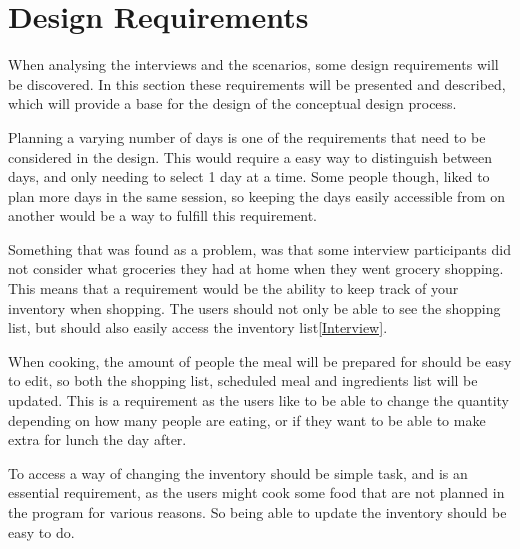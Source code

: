 \section{Design Requirements}

When analysing the interviews and the scenarios, some design requirements will be discovered. In this section these requirements will be presented and described, which will provide a base for the design of the conceptual design process.

Planning a varying number of days is one of the requirements that need to be considered in the design. This would require a easy way to distinguish between days, and only needing to select 1 day at a time.
Some people though, liked to plan more days in the same session, so keeping the days easily accessible from on another would be a way to fulfill this requirement.

Something that was found as a problem, was that some interview participants did not consider what groceries they had at home when they went grocery shopping. This means that a requirement would be the ability to keep track of your inventory when shopping. The users should not only be able to see the shopping list, but should also easily access the inventory list\ref{Interview}.

When cooking, the amount of people the meal will be prepared for should be easy to edit, so both the shopping list, scheduled meal and ingredients list will be updated. This is a requirement as the users like to be able to change the quantity depending on how many people are eating, or if they want to be able to make extra for lunch the day after. %

To access a way of changing the inventory should be simple task, and is an essential requirement, as the users might cook some food that are not planned in the program for various reasons. So being able to update the inventory should be easy to do.